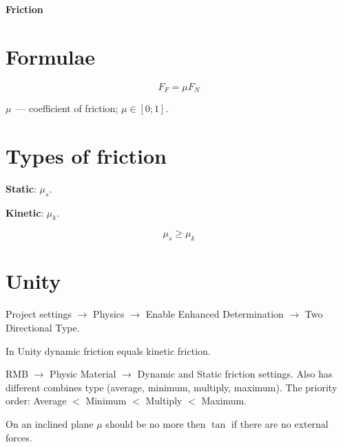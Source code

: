 \documentclass[12pt]{article}
\begin{document}
	\begin{center}
		\huge \textbf{Friction}
	\end{center}
	
	\section*{Formulae}
	
	$$F_F = \mu F_N$$
	
	$\mu$~--- coefficient of friction; $\mu \in [0; 1]$.
	
	\section*{Types of friction}
	
	\textbf{Static}: $\mu_s$.
	
	\noindent \textbf{Kinetic}: $\mu_k$.
	
	$$\mu_s \geqslant \mu_k$$
	
	\section*{Unity}
	
	Project settings $\rightarrow$ Physics $\rightarrow$ Enable Enhanced Determination $\rightarrow$ Two Directional Type.
	
	In Unity dynamic friction equals kinetic friction.
	
	RMB $\rightarrow$ Physic Material $\rightarrow$ Dynamic and Static friction settings. Also has different combines type (average, minimum, multiply, maximum). The priority order: Average $<$ Minimum $<$ Multiply $<$ Maximum.
	
	On an inclined plane $\mu$ should be no more then $\tan$ if there are no external forces.
\end{document}

